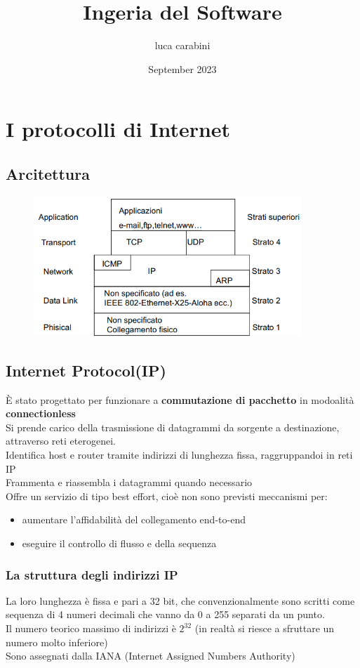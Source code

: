 \documentclass{report}
\title{Ingeria del Software}
\author{luca carabini}
\date{September 2023}
\begin{document}
\maketitle
\tableofcontents
\chapter{I protocolli di Internet}
    \section{Arcitettura}
        \begin{figure}[H]
            \includegraphics[width=0.9\textwidth]{1/Architettura.png}
        \end{figure}
    \section{Internet Protocol(IP)}
        È stato progettato per funzionare a \textbf{commutazione di pacchetto} in modoalità \textbf{connectionless}
        \\
        Si prende carico della trasmissione di datagrammi da sorgente a destinazione, attraverso reti eterogenei.
        \\
        Identifica host e router tramite indirizzi di lunghezza fissa, raggruppandoi in reti IP
        \\
        Frammenta e riassembla i datagrammi quando necessario
        \\
        Offre un servizio di tipo best effort, cioè non sono previsti meccanismi per:
        \begin{itemize}
            \item aumentare l'affidabilità del collegamento end-to-end
            \item eseguire il controllo di flusso e della sequenza
        \end{itemize}
        \subsection{La struttura degli indirizzi IP}
            La loro lunghezza è fissa e pari a 32 bit, che convenzionalmente sono scritti come sequenza di 4 numeri decimali che vanno da 0 a 255 separati da un punto.
            \\
            Il numero teorico massimo di indirizzi è $2^{32}$ (in realtà si riesce a sfruttare un numero molto inferiore)
            \\
            Sono assegnati dalla IANA (Internet Assigned Numbers Authority)
\end{document}
